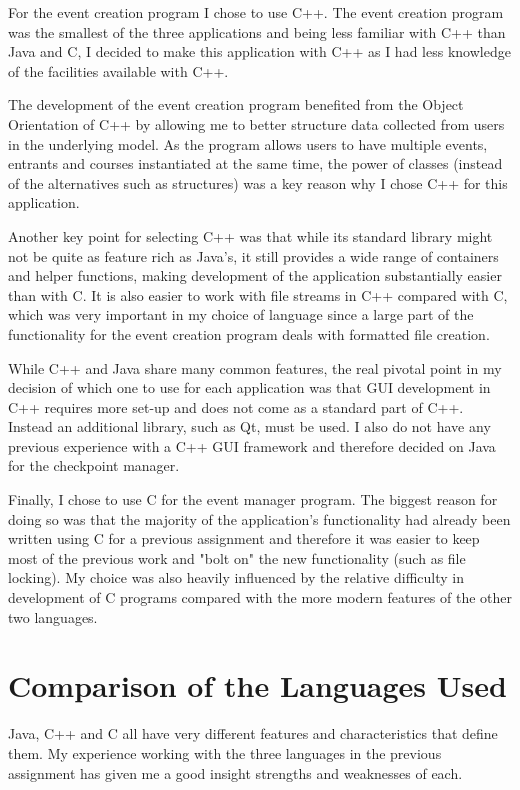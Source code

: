 \documentclass{article}
\begin{document}
For the event creation program I chose to use C++. The event creation program was the smallest of the three applications and being less familiar with C++ than Java and C, I decided to make this application with C++ as I had less knowledge of the facilities available with C++.

The development of the event creation program benefited from the Object Orientation of C++ by allowing me to better structure data collected from users in the underlying model. As the program allows users to have multiple events, entrants and courses instantiated at the same time, the power of classes (instead of the alternatives such as structures) was a key reason why I chose C++ for this application.

Another key point for selecting C++ was that while its standard library might not be quite as feature rich as Java's, it still provides a wide range of containers and helper functions, making development of the application substantially easier than with C. It is also easier to work with file streams in C++ compared with C, which was very important in my choice of language since a large part of the functionality for the event creation program deals with formatted file creation.

While C++ and Java share many common features, the real pivotal point in my decision of which one to use for each application was that GUI development in C++ requires more set-up and does not come as a standard part of C++. Instead an additional library, such as Qt, must be used. I also do not have any previous experience with a C++ GUI framework and therefore decided on Java for the checkpoint manager.

Finally, I chose to use C for the event manager program. The biggest reason for doing so was that the majority of the application's functionality had already been written using C for a previous assignment and therefore it was easier to keep most of the previous work and "bolt on" the new functionality (such as file locking). My choice was also heavily influenced by the relative difficulty in development of C programs compared with the more modern features of the other two languages.

\section{Comparison of the Languages Used}
Java, C++ and C all have very different features and characteristics that define them. My experience working with the three languages in the previous assignment has given me a good insight strengths and weaknesses of each.
\end{document}
